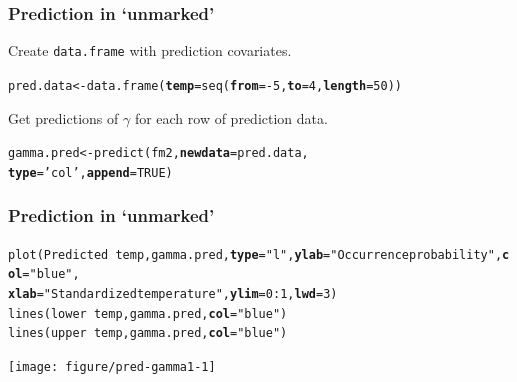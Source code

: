 \documentclass[color=usenames,dvipsnames]{beamer}\usepackage[]{graphicx}\usepackage[]{color}
\makeatletter
\newcommand{\hlnum}[1]{\textcolor[rgb]{0.69,0.494,0}{#1}}%
\newcommand{\hlstr}[1]{\textcolor[rgb]{0.749,0.012,0.012}{#1}}%
\newcommand{\hlopt}[1]{\textcolor[rgb]{0,0,0}{#1}}%
\newcommand{\hlstd}[1]{\textcolor[rgb]{0,0,0}{#1}}%
\newcommand{\hlkwb}[1]{\textcolor[rgb]{0,0.341,0.682}{#1}}%
\newcommand{\hlkwc}[1]{\textcolor[rgb]{0,0,0}{\textbf{#1}}}%
\newcommand{\hlkwd}[1]{\textcolor[rgb]{0.004,0.004,0.506}{#1}}%
\newenvironment{kframe}{%
 \def\at@end@of@kframe{}%
 \ifinner\ifhmode%
  \def\at@end@of@kframe{\end{minipage}}%
  \begin{minipage}{\columnwidth}%
 \fi\fi%
 \def\FrameCommand##1{\hskip\@totalleftmargin \hskip-\fboxsep
 \colorbox{shadecolor}{##1}\hskip-\fboxsep
     \hskip-\linewidth \hskip-\@totalleftmargin \hskip\columnwidth}%
 \MakeFramed {\advance\hsize-\width
   \@totalleftmargin\z@ \linewidth\hsize
   \@setminipage}}%
 {\par\unskip\endMakeFramed%
 \at@end@of@kframe}
\newenvironment{knitrout}{}{} %
\makeatother
\begin{document}
\begin{frame}[fragile]
  \frametitle{Prediction in `unmarked'}
  Create \texttt{data.frame} with prediction covariates. 
\begin{knitrout}\footnotesize
{}\color{fgcolor}\begin{kframe}
\begin{alltt}
\hlstd{pred.data} \hlkwb{<-} \hlkwd{data.frame}\hlstd{(}\hlkwc{temp}\hlstd{=}\hlkwd{seq}\hlstd{(}\hlkwc{from}\hlstd{=}\hlopt{-}\hlnum{5}\hlstd{,} \hlkwc{to}\hlstd{=}\hlnum{4}\hlstd{,} \hlkwc{length}\hlstd{=}\hlnum{50}\hlstd{))}
\end{alltt}
\end{kframe}
\end{knitrout}
\pause
\vfill
Get predictions of $\gamma$ for each row of prediction data.
\begin{knitrout}\footnotesize
{}\color{fgcolor}\begin{kframe}
\begin{alltt}
\hlstd{gamma.pred} \hlkwb{<-} \hlkwd{predict}\hlstd{(fm2,} \hlkwc{newdata}\hlstd{=pred.data,}
                      \hlkwc{type}\hlstd{=}\hlstr{'col'}\hlstd{,} \hlkwc{append}\hlstd{=}\hlnum{TRUE}\hlstd{)}
\end{alltt}
\end{kframe}
\end{knitrout}
\end{frame}







\begin{frame}[fragile]
  \frametitle{Prediction in `unmarked'}
\begin{knitrout}\tiny
{}\color{fgcolor}\begin{kframe}
\begin{alltt}
\hlkwd{plot}\hlstd{(Predicted} \hlopt{~} \hlstd{temp, gamma.pred,} \hlkwc{type}\hlstd{=}\hlstr{"l"}\hlstd{,} \hlkwc{ylab}\hlstd{=}\hlstr{"Occurrence probability"}\hlstd{,} \hlkwc{col}\hlstd{=}\hlstr{"blue"}\hlstd{,}
     \hlkwc{xlab}\hlstd{=}\hlstr{"Standardized temperature"}\hlstd{,} \hlkwc{ylim}\hlstd{=}\hlnum{0}\hlopt{:}\hlnum{1}\hlstd{,} \hlkwc{lwd}\hlstd{=}\hlnum{3}\hlstd{)}
\hlkwd{lines}\hlstd{(lower} \hlopt{~} \hlstd{temp, gamma.pred,} \hlkwc{col}\hlstd{=}\hlstr{"blue"}\hlstd{)}
\hlkwd{lines}\hlstd{(upper} \hlopt{~} \hlstd{temp, gamma.pred,} \hlkwc{col}\hlstd{=}\hlstr{"blue"}\hlstd{)}
\end{alltt}
\end{kframe}

{\centering \texttt{[image: figure/pred-gamma1-1]} 

}



\end{knitrout}
\end{frame}
\end{document}
